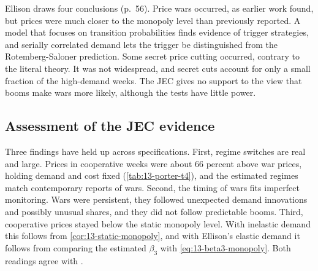 Ellison draws four conclusions (p.~56). Price wars occurred, as earlier work found, but prices were much closer
to the monopoly level than previously reported. A model that focuses on transition probabilities finds evidence of
trigger strategies, and serially correlated demand lets the trigger be distinguished from the Rotemberg-Saloner
prediction. Some secret price cutting occurred, contrary to the literal theory. It was not widespread, and
secret cuts account for only a small fraction of the high-demand weeks. The JEC gives no support to the view that
booms make wars more likely, although the tests have little power.

\subsection{Assessment of the JEC evidence}\label{sec:13-jec-assessment}

Three findings have held up across specifications. First, regime switches are real and large. Prices in
cooperative weeks were about 66 percent above war prices, holding demand and cost fixed (\cref{tab:13-porter-t4}),
and the estimated regimes match contemporary reports of wars. Second, the timing of wars fits imperfect monitoring.
Wars were persistent, they followed unexpected demand innovations and possibly unusual shares, and they did not
follow predictable booms. Third, cooperative prices stayed below the static monopoly level. With inelastic demand
this follows from \cref{cor:13-static-monopoly}, and with Ellison's elastic demand it follows from comparing the
estimated $\beta_3$ with \eqref{eq:13-beta3-monopoly}. Both readings agree with \citet{Porter1983b}.

